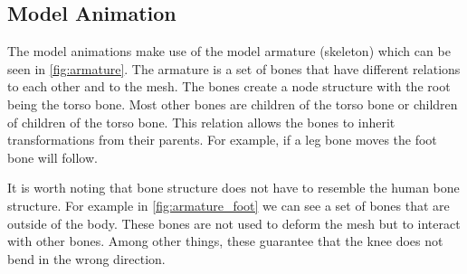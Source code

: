 \subsection{Model Animation} \label{sec:theory_theory_models_animation}
The model animations make use of the model armature (skeleton) which can be seen in \autoref{fig:armature}.
The armature is a set of bones that have different relations to each other and to the mesh.
The bones create a node structure with the root being the torso bone.
Most other bones are children of the torso bone or children of children of the torso bone.
This relation allows the bones to inherit transformations from their parents.
For example, if a leg bone moves the foot bone will follow. 

It is worth noting that bone structure does not have to resemble the human bone structure.
For example in \autoref{fig:armature_foot} we can see a set of bones that are outside of the body.
These bones are not used to deform the mesh but to interact with other bones.
Among other things, these guarantee that the knee does not bend in the wrong direction.


